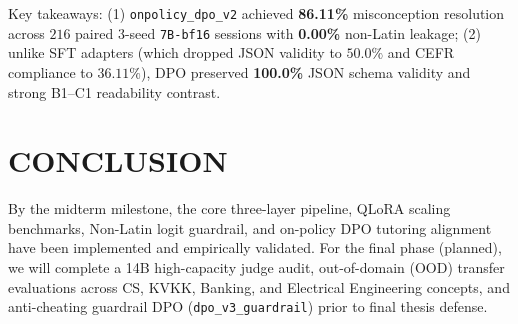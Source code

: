 \documentclass[a4paper,12pt]{report}
\begin{document}
Key takeaways: (1) \texttt{onpolicy\_dpo\_v2} achieved \textbf{86.11\%} misconception resolution across $216$ paired 3-seed \texttt{7B-bf16} sessions with \textbf{0.00\%} non-Latin leakage; (2) unlike SFT adapters (which dropped JSON validity to $50.0\%$ and CEFR compliance to $36.11\%$), DPO preserved \textbf{100.0\%} JSON schema validity and strong B1--C1 readability contrast.

\chapter{CONCLUSION}

By the midterm milestone, the core three-layer pipeline, QLoRA scaling benchmarks, Non-Latin logit guardrail, and on-policy DPO tutoring alignment have been implemented and empirically validated. For the final phase (planned), we will complete a 14B high-capacity judge audit, out-of-domain (OOD) transfer evaluations across CS, KVKK, Banking, and Electrical Engineering concepts, and anti-cheating guardrail DPO (\texttt{dpo\_v3\_guardrail}) prior to final thesis defense.



\end{document}
